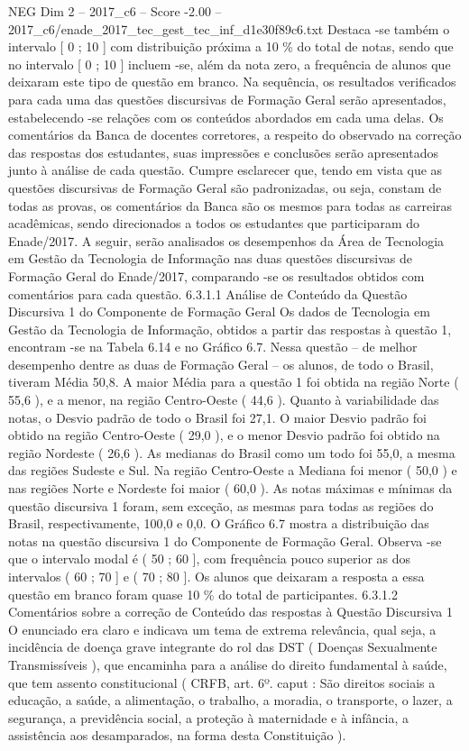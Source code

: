 \begin{textsample}{NEG Dim 2 – 2017\_c6 – Score -2.00 – 2017\_c6/enade\_2017\_tec\_gest\_tec\_inf\_d1e30f89c6.txt}
Destaca -se também o intervalo [ 0 ; 10 ] com distribuição próxima a 10 \% do total de notas, sendo que no intervalo [ 0 ; 10 ] incluem -se, além da nota zero, a frequência de alunos que deixaram este tipo de questão em branco.
Na sequência, os resultados verificados para cada uma das questões discursivas de Formação Geral serão apresentados, estabelecendo -se relações com os conteúdos abordados em cada uma delas.
Os comentários da Banca de docentes corretores, a respeito do observado na correção das respostas dos estudantes, suas impressões e conclusões serão apresentados junto à análise de cada questão.
Cumpre esclarecer que, tendo em vista que as questões discursivas de Formação Geral são padronizadas, ou seja, constam de todas as provas, os comentários da Banca são os mesmos para todas as carreiras acadêmicas, sendo direcionados a todos os estudantes que participaram do Enade/2017.
A seguir, serão analisados os desempenhos da Área de Tecnologia em Gestão da Tecnologia de Informação nas duas questões discursivas de Formação Geral do Enade/2017, comparando -se os resultados obtidos com comentários para cada questão. 6.3.1.1 Análise de Conteúdo da Questão Discursiva 1 do Componente de Formação Geral Os dados de Tecnologia em Gestão da Tecnologia de Informação, obtidos a partir das respostas à questão 1, encontram -se na Tabela 6.14 e no Gráfico 6.7.
Nessa questão – de melhor desempenho dentre as duas de Formação Geral – os alunos, de todo o Brasil, tiveram Média 50,8.
A maior Média para a questão 1 foi obtida na região Norte ( 55,6 ), e a menor, na região Centro-Oeste ( 44,6 ).
Quanto à variabilidade das notas, o Desvio padrão de todo o Brasil foi 27,1.
O maior Desvio padrão foi obtido na região Centro-Oeste ( 29,0 ), e o menor Desvio padrão foi obtido na região Nordeste ( 26,6 ).
As medianas do Brasil como um todo foi 55,0, a mesma das regiões Sudeste e Sul.
Na região Centro-Oeste a Mediana foi menor ( 50,0 ) e nas regiões Norte e Nordeste foi maior ( 60,0 ).
As notas máximas e mínimas da questão discursiva 1 foram, sem exceção, as mesmas para todas as regiões do Brasil, respectivamente, 100,0 e 0,0.
O Gráfico 6.7 mostra a distribuição das notas na questão discursiva 1 do Componente de Formação Geral.
Observa -se que o intervalo modal é ( 50 ; 60 ], com frequência pouco superior as dos intervalos ( 60 ; 70 ] e ( 70 ; 80 ].
Os alunos que deixaram a resposta a essa questão em branco foram quase 10 \% do total de participantes. 6.3.1.2 Comentários sobre a correção de Conteúdo das respostas à Questão Discursiva 1 O enunciado era claro e indicava um tema de extrema relevância, qual seja, a incidência de doença grave integrante do rol das DST ( Doenças Sexualmente Transmissíveis ), que encaminha para a análise do direito fundamental à saúde, que tem assento constitucional ( CRFB, art. 6º. caput : São direitos sociais a educação, a saúde, a alimentação, o trabalho, a moradia, o transporte, o lazer, a segurança, a previdência social, a proteção à maternidade e à infância, a assistência aos desamparados, na forma desta Constituição ).

\end{textsample}
